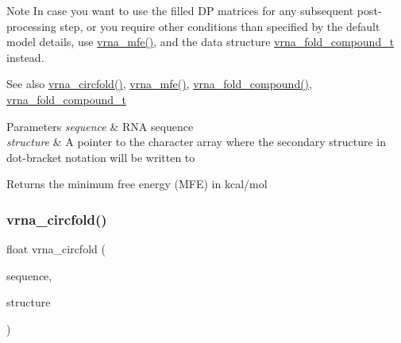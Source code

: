 \begin{DoxyNote}{Note}
In case you want to use the filled DP matrices for any subsequent post-\/processing step, or you require other conditions than specified by the default model details, use \mbox{\hyperlink{group__mfe__fold_gabd3b147371ccf25c577f88bbbaf159fd}{vrna\+\_\+mfe()}}, and the data structure \mbox{\hyperlink{group__fold__compound_ga1b0cef17fd40466cef5968eaeeff6166}{vrna\+\_\+fold\+\_\+compound\+\_\+t}} instead.
\end{DoxyNote}
\begin{DoxySeeAlso}{See also}
\mbox{\hyperlink{group__mfe__fold__single_gaf973483d8acbc8cc9aacfc8a9b7f0074}{vrna\+\_\+circfold()}}, \mbox{\hyperlink{group__mfe__fold_gabd3b147371ccf25c577f88bbbaf159fd}{vrna\+\_\+mfe()}}, \mbox{\hyperlink{group__fold__compound_ga6601d994ba32b11511b36f68b08403be}{vrna\+\_\+fold\+\_\+compound()}}, \mbox{\hyperlink{group__fold__compound_ga1b0cef17fd40466cef5968eaeeff6166}{vrna\+\_\+fold\+\_\+compound\+\_\+t}}
\end{DoxySeeAlso}

\begin{DoxyParams}{Parameters}
{\em sequence} & R\+NA sequence \\
\hline
{\em structure} & A pointer to the character array where the secondary structure in dot-\/bracket notation will be written to \\
\hline
\end{DoxyParams}
\begin{DoxyReturn}{Returns}
the minimum free energy (M\+FE) in kcal/mol 
\end{DoxyReturn}
\mbox{\label{group__mfe__fold__single_gaf973483d8acbc8cc9aacfc8a9b7f0074}} 
\subsubsection{\texorpdfstring{vrna\+\_\+circfold()}{vrna\_circfold()}}
{\footnotesize\ttfamily float vrna\+\_\+circfold (\begin{DoxyParamCaption}\item[{const char $\ast$}]{sequence,  }\item[{char $\ast$}]{structure }\end{DoxyParamCaption})}



